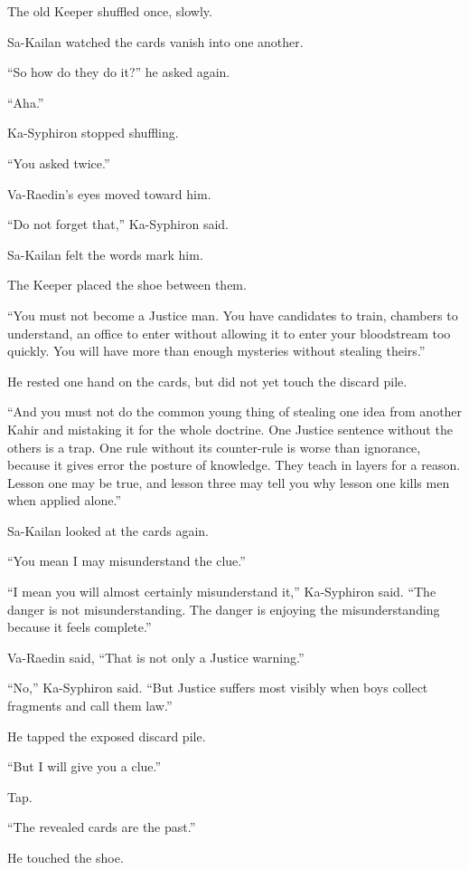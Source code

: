 The old Keeper shuffled once, slowly.\par
Sa-Kailan watched the cards vanish into one another.\par
“So how do they do it?” he asked again.\par
“Aha.”\par
Ka-Syphiron stopped shuffling.\par
“You asked twice.”\par
Va-Raedin’s eyes moved toward him.\par
“Do not forget that,” Ka-Syphiron said.\par
Sa-Kailan felt the words mark him.\par
The Keeper placed the shoe between them.\par
“You must not become a Justice man. You have candidates to train, chambers to understand, an office to enter without allowing it to enter your bloodstream too quickly. You will have more than enough mysteries without stealing theirs.”\par
He rested one hand on the cards, but did not yet touch the discard pile.\par
“And you must not do the common young thing of stealing one idea from another Kahir and mistaking it for the whole doctrine. One Justice sentence without the others is a trap. One rule without its counter-rule is worse than ignorance, because it gives error the posture of knowledge. They teach in layers for a reason. Lesson one may be true, and lesson three may tell you why lesson one kills men when applied alone.”\par
Sa-Kailan looked at the cards again.\par
“You mean I may misunderstand the clue.”\par
“I mean you will almost certainly misunderstand it,” Ka-Syphiron said. “The danger is not misunderstanding. The danger is enjoying the misunderstanding because it feels complete.”\par
Va-Raedin said, “That is not only a Justice warning.”\par
“No,” Ka-Syphiron said. “But Justice suffers most visibly when boys collect fragments and call them law.”\par
He tapped the exposed discard pile.\par
“But I will give you a clue.”\par
Tap.\par
“The revealed cards are the past.”\par
He touched the shoe.\par
